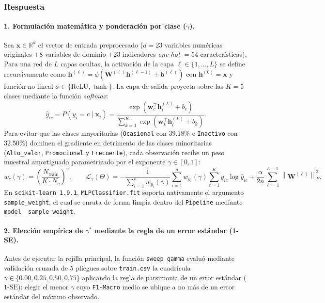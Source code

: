 \documentclass[11pt,a4paper]{article}
\newcommand{\code}[1]{\texttt{\small #1}}
\begin{document}
\subsubsection*{Respuesta}

\paragraph{1. Formulación matemática y ponderación por clase ($\gamma$).}
Sea $\mathbf{x} \in \mathbb{R}^{d}$ el vector de entrada preprocesado ($d = 23$ variables numéricas originales $+ 8$ variables de dominio $+ 23$ indicadores \textit{one-hot} $= 54$ características). Para una red de $L$ capas ocultas, la activación de la capa $\ell \in \{1,\dots,L\}$ se define recursivamente como $\mathbf{h}^{(\ell)} = \phi\!\left(\mathbf{W}^{(\ell)}\mathbf{h}^{(\ell-1)} + \mathbf{b}^{(\ell)}\right)$ con $\mathbf{h}^{(0)} = \mathbf{x}$ y función no lineal $\phi \in \{\text{ReLU}, \tanh\}$. La capa de salida proyecta sobre las $K = 5$ clases mediante la función \textit{softmax}:
\begin{equation}
    \hat{y}_{ic} = P(y_i = c \mid \mathbf{x}_i) = \frac{\exp\!\left(\mathbf{w}_c^\top \mathbf{h}_i^{(L)} + b_c\right)}{\sum_{k=1}^{K} \exp\!\left(\mathbf{w}_k^\top \mathbf{h}_i^{(L)} + b_k\right)}.
\end{equation}
Para evitar que las clases mayoritarias (\code{Ocasional} con $39.18\%$ e \code{Inactivo} con $32.50\%$) dominen el gradiente en detrimento de las clases minoritarias (\code{Alto\_valor}, \code{Promocional} y \code{Frecuente}), cada observación recibe un peso muestral amortiguado parametrizado por el exponente $\gamma \in [0, 1]$:
\begin{equation}
    w_c(\gamma) = \left(\frac{N_{\text{train}}}{K \cdot N_c}\right)^{\gamma}, \qquad \mathcal{L}_{\gamma}(\Theta) = -\frac{1}{\sum_{i=1}^{n} w_{y_i}(\gamma)} \sum_{i=1}^{n} w_{y_i}(\gamma) \sum_{c=1}^{K} y_{ic} \log \hat{y}_{ic} + \frac{\alpha}{2n} \sum_{\ell=1}^{L+1} \left\lVert \mathbf{W}^{(\ell)} \right\rVert_F^2.
\end{equation}
En \code{scikit-learn 1.9.1}, \code{MLPClassifier.fit} soporta nativamente el argumento \code{sample\_weight}, el cual se enruta de forma limpia dentro del \code{Pipeline} mediante \code{model\_\_sample\_weight}.

\paragraph{2. Elección empírica de $\gamma^*$ mediante la regla de un error estándar (1-SE).}
Antes de ejecutar la rejilla principal, la función \code{sweep\_gamma} evaluó mediante validación cruzada de $5$ pliegues sobre \code{train.csv} la cuadrícula $\gamma \in \{0.00, 0.25, 0.50, 0.75\}$ aplicando la regla de parsimonia de un error estándar ($1\text{-SE}$): elegir el menor $\gamma$ cuyo \code{F1-Macro} medio se ubique a no más de un error estándar del máximo observado.
\end{document}
